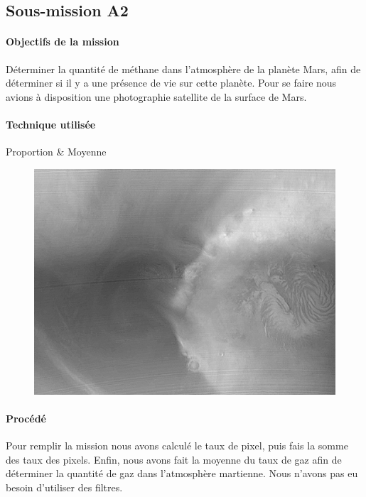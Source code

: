 	\subsection{Sous-mission A2}
	\begin{vwcol}[widths={0.65,0.2}, rule=0pt]
		\begin{minipage}{0.7\textwidth}
			\paragraph{Objectifs de la mission}

			Déterminer la quantité de méthane dans l'atmosphère de la planète Mars, afin de déterminer si il y a une présence de vie sur cette planète. Pour se faire nous avions à disposition une photographie satellite de la surface de Mars.
		\end{minipage}

		\begin{minipage}{0.3\textwidth}
			\begin{flushright}
				\paragraph{Technique utilisée}
			
				Proportion \&
				Moyenne
			\end{flushright}
		\end{minipage}
	\end{vwcol} 

	\begin{figure}[h]
		\centering
		\includegraphics[scale=0.6]{images/Mars_surface.png}
	\end{figure}
	\vspace{-0.3cm}

	\paragraph{Procédé}	
		Pour remplir la mission nous avons calculé le taux de pixel, puis fais la somme des taux des pixels. Enfin, nous avons fait la moyenne du taux de gaz afin de déterminer la quantité de gaz dans l'atmosphère martienne. Nous n'avons pas eu besoin d'utiliser des filtres.